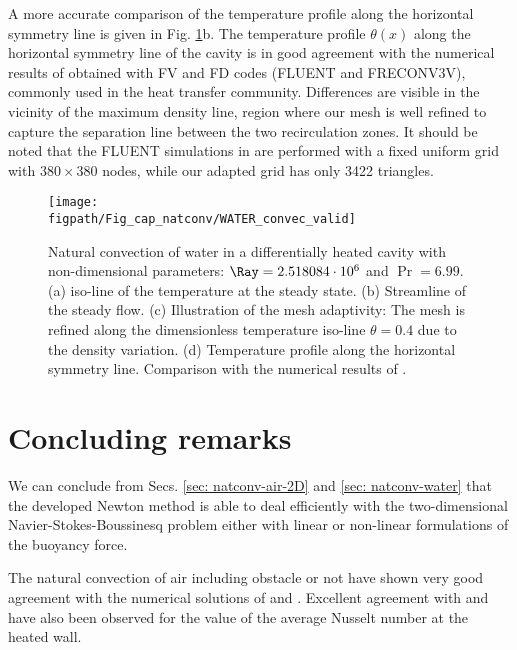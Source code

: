 A more accurate comparison of the temperature profile along the horizontal symmetry line is given in Fig. \ref{fig-T1w-isoT}b. 
The temperature profile $\theta(x)$ along the horizontal symmetry line of the cavity is in good agreement with the numerical results   of \cite{Kowalewski-2003} obtained with FV and FD codes (FLUENT and FRECONV3V), commonly used in the heat transfer community. Differences are visible in the vicinity of the maximum density line, region where our mesh is well refined to capture the separation line between the two recirculation zones. It should be noted that the FLUENT simulations in \cite{Kowalewski-2003} are performed with a fixed uniform grid with $380\times380$ nodes, while our adapted grid has only 3422 triangles.

\begin{figure}
	\begin{center}
		\texttt{[image: \\figpath/Fig\_cap\_natconv/WATER\_convec\_valid]}
	\end{center}
	\caption{Natural convection of water in a differentially heated cavity with non-dimensional parameters: $\Ray=2.518084\cdot 10^{6}$ and $\Pr=6.99$. (a) iso-line of the temperature at the steady state. (b) Streamline of the steady flow. (c) Illustration of the mesh adaptivity: The mesh is refined along the dimensionless temperature iso-line $\theta = 0.4$ due to the density variation. (d) Temperature profile along the horizontal symmetry line. Comparison with the numerical results of \cite{Kowalewski-2003}.}
	\label{fig-T1w-isoT} %
\end{figure}

\newpage
\section{Concluding remarks}

We can conclude from Secs. \ref{sec: natconv-air-2D} and \ref{sec: natconv-water} that the developed Newton method is able to deal  efficiently with the two-dimensional Navier-Stokes-Boussinesq problem either with linear or non-linear formulations of the buoyancy force.

\noindent The natural convection of air including obstacle or not have shown very good agreement with the numerical solutions of \cite{LeQuere91} and \cite{Raluca2013}.
Excellent agreement with \cite{de1983natural} and \cite{LeQuere91} have also been observed for the value of the average Nusselt number at the heated wall. 


